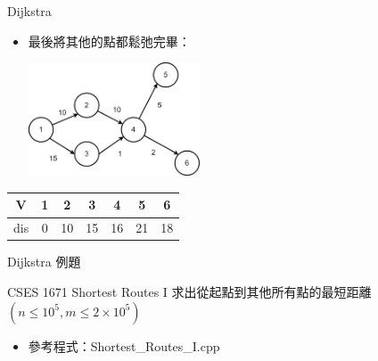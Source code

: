 \documentclass[aspectratio=169]{beamer}
\begin{document}
    \begin{frame}{Dijkstra}
        \begin{itemize}
            \item 最後將其他的點都鬆弛完畢：
            \begin{center}
                \includegraphics[width=0.4\textwidth]{src/dijkstra_1.png}
            \end{center}
        \end{itemize}

        \begin{center}
            \begin{tabular}{c|c|c|c|c|c|c}
                V & 1 & 2 & 3 & 4 & 5 & 6 \\
                \hline
                dis & 0 & 10 & 15 & 16 & 21 & 18
            \end{tabular}
        \end{center}
    \end{frame}

    \begin{frame}{Dijkstra 例題}
        \begin{block}{CSES 1671 Shortest Routes I}
            求出從起點到其他所有點的最短距離 \\
            $(n \le 10^5, m \le 2 \times 10^5)$
        \end{block}

        \begin{itemize}
            \item 參考程式：Shortest\_Routes\_I.cpp
        \end{itemize}
    \end{frame}
        
\end{document}

